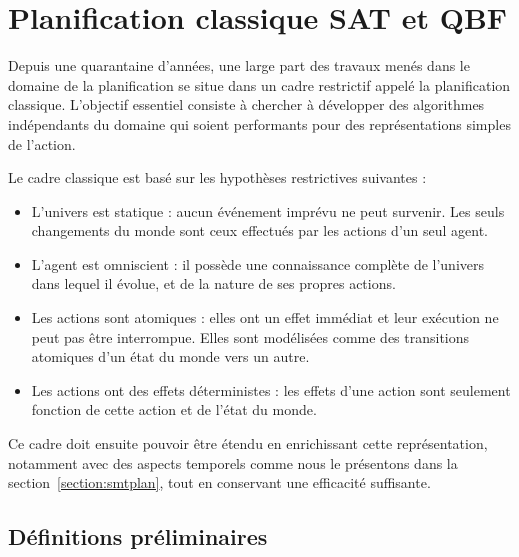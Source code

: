 \section{Planification classique SAT et QBF}
%

Depuis une quarantaine d’années, une large part des travaux menés dans le domaine de la planification se situe dans un cadre restrictif appelé la planification classique. L’objectif essentiel consiste à chercher à développer des algorithmes indépendants du domaine qui soient performants pour des représentations simples de l'action.

Le cadre classique est basé sur les hypothèses restrictives suivantes :
\begin{itemize}
\item L’univers est statique : aucun événement imprévu ne peut survenir. Les seuls changements du monde sont ceux effectués par les actions d'un seul agent.
\item L’agent est omniscient : il possède une connaissance complète de l'univers dans lequel il évolue, et de la nature de ses propres actions.
\item Les actions sont atomiques : elles ont un effet immédiat et leur exécution ne peut pas être interrompue. Elles sont modélisées comme des transitions atomiques d'un état du monde vers un autre.
\item Les actions ont des effets déterministes : les effets d'une action sont seulement fonction de cette action et de l'état du monde.
\end{itemize}

Ce cadre doit ensuite pouvoir être étendu en enrichissant cette représentation, notamment avec des aspects temporels comme nous le présentons dans la section~\ref{section:smtplan}, tout en conservant une efficacité suffisante.

\subsection{Définitions préliminaires}

